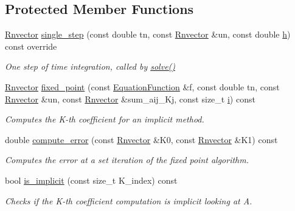 \subsection*{Protected Member Functions}
\begin{DoxyCompactItemize}
\item 
\hyperlink{utils_8hpp_a8e0cccfe9e5cee5140bfcfbd9a3a6a0e}{Rnvector} \hyperlink{classRKSolver_a12a097a860de0ed2647344661133ba90}{single\+\_\+step} (const double tn, const \hyperlink{utils_8hpp_a8e0cccfe9e5cee5140bfcfbd9a3a6a0e}{Rnvector} \&un, const double \hyperlink{classBaseSolver_a6dbedd1610b0979379e6acbb0a4093cd}{h}) const override
\begin{DoxyCompactList}\small\item\em One step of time integration, called by \hyperlink{classRKSolver_aa251eaaa56b4ef39d95347579b8a6259}{solve()} \end{DoxyCompactList}\item 
\hyperlink{utils_8hpp_a8e0cccfe9e5cee5140bfcfbd9a3a6a0e}{Rnvector} \hyperlink{classRKSolver_abb7c57c57c820ab981eab492ad9511db}{fixed\+\_\+point} (const \hyperlink{structEquationFunction}{Equation\+Function} \&f, const double tn, const \hyperlink{utils_8hpp_a8e0cccfe9e5cee5140bfcfbd9a3a6a0e}{Rnvector} \&un, const \hyperlink{utils_8hpp_a8e0cccfe9e5cee5140bfcfbd9a3a6a0e}{Rnvector} \&sum\+\_\+aij\+\_\+\+Kj, const size\+\_\+t \hyperlink{check__solution_8m_a13f9e50c822abf30972ff66327970c25}{i}) const
\begin{DoxyCompactList}\small\item\em Computes the K-\/th coefficient for an implicit method. \end{DoxyCompactList}\item 
double \hyperlink{classRKSolver_a0d3892f1b340e82c8aa135441f5adbed}{compute\+\_\+error} (const \hyperlink{utils_8hpp_a8e0cccfe9e5cee5140bfcfbd9a3a6a0e}{Rnvector} \&K0, const \hyperlink{utils_8hpp_a8e0cccfe9e5cee5140bfcfbd9a3a6a0e}{Rnvector} \&K1) const
\begin{DoxyCompactList}\small\item\em Computes the error at a set iteration of the fixed point algorithm. \end{DoxyCompactList}\item 
bool \hyperlink{classRKSolver_a3362f4ffb68c9fc3fc1dd1bdf36233fa}{is\+\_\+implicit} (const size\+\_\+t K\+\_\+index) const
\begin{DoxyCompactList}\small\item\em Checks if the K-\/th coefficient computation is implicit looking at A. \end{DoxyCompactList}\end{DoxyCompactItemize}
